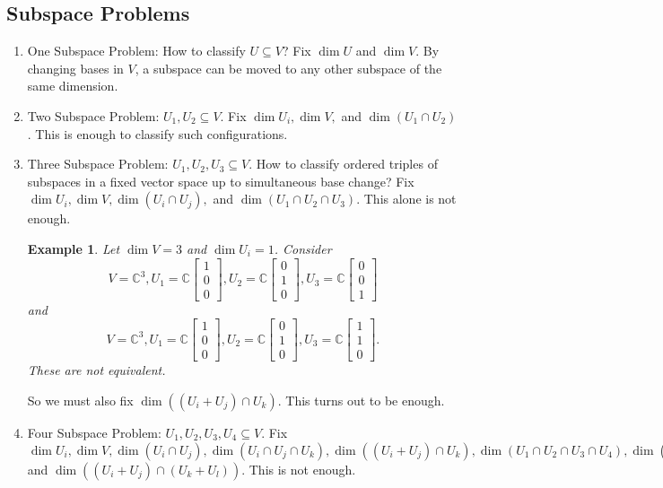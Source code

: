 \documentclass{book}
\newtheorem{example}{Example}[section]
\begin{document}
  	\subsection{Subspace Problems}
		\begin{enumerate}
			\item One Subspace Problem: How to classify $U \subseteq V$? Fix $\dim U$ and $\dim V$. By changing bases in $V$, a subspace can be moved to any other subspace of the same dimension.
			\item Two Subspace Problem:  $U_1,U_2 \subseteq V$. Fix $\dim U_i, \dim V,$ and $\dim (U_1\cap U_2)$. This is enough to classify such configurations.
			\item Three Subspace Problem: $U_1,U_2,U_3 \subseteq V$. How to classify ordered triples of subspaces in a fixed vector space up to simultaneous base change?  Fix $\dim U_i, \dim V, \dim (U_i\cap U_j),$ and $\dim (U_1\cap U_2\cap U_3)$. This alone is not enough.
				\begin{example}
					Let $\dim V=3$ and $\dim U_i=1$. Consider \[V=\mathbb{C}^3, U_1 = \mathbb{C} \begin{bmatrix}1\\0\\0\end{bmatrix},U_2 = \mathbb{C} \begin{bmatrix}0\\1\\0\end{bmatrix},U_3 = \mathbb{C} \begin{bmatrix}0\\0\\1\end{bmatrix}\] and  \[V=\mathbb{C}^3, U_1 = \mathbb{C} \begin{bmatrix}1\\0\\0\end{bmatrix},U_2 = \mathbb{C} \begin{bmatrix}0\\1\\0\end{bmatrix},U_3 = \mathbb{C} \begin{bmatrix}1\\1\\0\end{bmatrix}.\] These are not equivalent.
				\end{example}
			So we must also fix $\dim ((U_i + U_j)\cap U_k)$. This turns out to be enough.
      \item Four Subspace Problem: $U_1,U_2,U_3, U_4 \subseteq V$. Fix $\dim U_i, \dim V, \dim (U_i\cap U_j),\dim (U_i\cap U_j\cap U_k), \dim ((U_i + U_j)\cap U_k),\dim (U_1\cap U_2 \cap U_3 \cap U_4),  \dim ((U_i + U_j+U_k)\cap U_l),$ and $ \dim ((U_i+ U_j)\cap (U_k+U_l)).$ This is not enough.

\end{enumerate}
\end{document}
